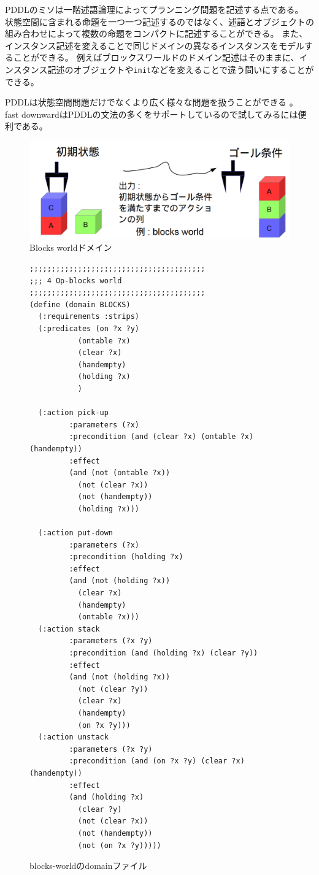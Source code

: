 \documentclass[10pt]{book}
\begin{document}
PDDLのミソは一階述語論理によってプランニング問題を記述する点である。
状態空間に含まれる命題を一つ一つ記述するのではなく、述語とオブジェクトの組み合わせによって複数の命題をコンパクトに記述することができる。
また、インスタンス記述を変えることで同じドメインの異なるインスタンスをモデルすることができる。
例えばブロックスワールドのドメイン記述はそのままに、インスタンス記述のオブジェクトや\texttt{init}などを変えることで違う問いにすることができる。

PDDLは状態空間問題だけでなくより広く様々な問題を扱うことができる \cite{aeronautiques1998pddl,fox2003pddl2}。
fast downwardはPDDLの文法の多くをサポートしているので試してみるには便利である。

\begin{figure}
\includegraphics[width=0.8\linewidth]{./figures/blocks-image.png}
\caption{Blocks worldドメイン}
\label{fig:sliding-token}
\end{figure}

\begin{figure}
\lstset{language=pddl,basicstyle=\ttfamily\footnotesize,breaklines=true}
\begin{lstlisting}
;;;;;;;;;;;;;;;;;;;;;;;;;;;;;;;;;;;;;;;;
;;; 4 Op-blocks world
;;;;;;;;;;;;;;;;;;;;;;;;;;;;;;;;;;;;;;;;
(define (domain BLOCKS)
  (:requirements :strips)
  (:predicates (on ?x ?y)
	       (ontable ?x)
	       (clear ?x)
	       (handempty)
	       (holding ?x)
	       )

  (:action pick-up
	     :parameters (?x)
	     :precondition (and (clear ?x) (ontable ?x) (handempty))
	     :effect
	     (and (not (ontable ?x))
		   (not (clear ?x))
		   (not (handempty))
		   (holding ?x)))

  (:action put-down
	     :parameters (?x)
	     :precondition (holding ?x)
	     :effect
	     (and (not (holding ?x))
		   (clear ?x)
		   (handempty)
		   (ontable ?x)))
  (:action stack
	     :parameters (?x ?y)
	     :precondition (and (holding ?x) (clear ?y))
	     :effect
	     (and (not (holding ?x))
		   (not (clear ?y))
		   (clear ?x)
		   (handempty)
		   (on ?x ?y)))
  (:action unstack
	     :parameters (?x ?y)
	     :precondition (and (on ?x ?y) (clear ?x) (handempty))
	     :effect
	     (and (holding ?x)
		   (clear ?y)
		   (not (clear ?x))
		   (not (handempty))
		   (not (on ?x ?y)))))
\end{lstlisting}
\caption{blocks-worldのdomainファイル}
\label{fig:pddl-domain}
\end{figure}
\end{document}
